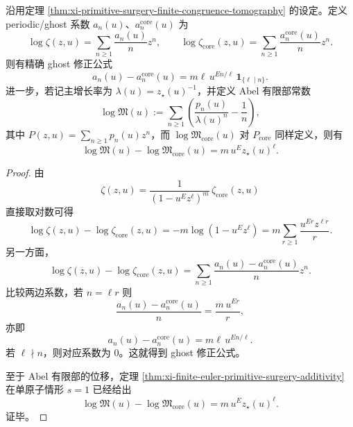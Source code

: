 \begin{theorem}\label{thm:xi-atomic-surgery-ghost-abel-shift-general}
沿用定理 \ref{thm:xi-primitive-surgery-finite-congruence-tomography} 的设定。定义 periodic/ghost 系数 \(a_n(u)\)、\(a_n^{\mathrm{core}}(u)\) 为
\[
\log \zeta(z,u)=\sum_{n\ge 1}\frac{a_n(u)}{n}z^n,
\qquad
\log \zeta_{\mathrm{core}}(z,u)=\sum_{n\ge 1}\frac{a_n^{\mathrm{core}}(u)}{n}z^n.
\]
则有精确 ghost 修正公式
\[
\boxed{\;
a_n(u)-a_n^{\mathrm{core}}(u)
=
m\ell\,u^{En/\ell}\,\mathbf 1_{\{\ell\mid n\}}.\;}
\]
进一步，若记主增长率为 \(\lambda(u)=z_\star(u)^{-1}\)，并定义 Abel 有限部常数
\[
\log\mathfrak M(u):=\sum_{n\ge 1}\left(\frac{p_n(u)}{\lambda(u)^n}-\frac1n\right),
\]
其中 \(P(z,u)=\sum_{n\ge 1}p_n(u)z^n\)，而 \(\log\mathfrak M_{\mathrm{core}}(u)\) 对 \(P_{\mathrm{core}}\) 同样定义，则有
\[
\boxed{\;
\log\mathfrak M(u)-\log\mathfrak M_{\mathrm{core}}(u)
=
m\,u^Ez_\star(u)^\ell.\;}
\]
\end{theorem}
\begin{proof}
由
\[
\zeta(z,u)=\frac{1}{(1-u^Ez^\ell)^m}\,\zeta_{\mathrm{core}}(z,u)
\]
直接取对数可得
\[
\log\zeta(z,u)-\log\zeta_{\mathrm{core}}(z,u)
=
-m\log(1-u^Ez^\ell)
=
m\sum_{r\ge 1}\frac{u^{Er}z^{\ell r}}{r}.
\]
另一方面，
\[
\log\zeta(z,u)-\log\zeta_{\mathrm{core}}(z,u)
=
\sum_{n\ge 1}\frac{a_n(u)-a_n^{\mathrm{core}}(u)}{n}z^n.
\]
比较两边系数，若 \(n=\ell r\) 则
\[
\frac{a_n(u)-a_n^{\mathrm{core}}(u)}{n}
=
\frac{m\,u^{Er}}{r},
\]
亦即
\[
a_n(u)-a_n^{\mathrm{core}}(u)
=
m\ell\,u^{En/\ell}.
\]
若 \(\ell\nmid n\)，则对应系数为 \(0\)。这就得到 ghost 修正公式。

至于 Abel 有限部的位移，定理 \ref{thm:xi-finite-euler-primitive-surgery-additivity} 在单原子情形 \(s=1\) 已经给出
\[
\log\mathfrak M(u)-\log\mathfrak M_{\mathrm{core}}(u)
=
m\,u^Ez_\star(u)^\ell.
\]
证毕。
\end{proof}









\endinput
